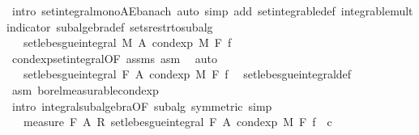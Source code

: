 \begin{isabellebody}
\ {\isacharparenleft}{\kern0pt}intro\ set{\isacharunderscore}{\kern0pt}integral{\isacharunderscore}{\kern0pt}mono{\isacharunderscore}{\kern0pt}AE{\isacharunderscore}{\kern0pt}banach{\isacharcomma}{\kern0pt}\ auto\ simp\ add{\isacharcolon}{\kern0pt}\ set{\isacharunderscore}{\kern0pt}integrable{\isacharunderscore}{\kern0pt}def\ integrable{\isacharunderscore}{\kern0pt}mult{\isacharunderscore}{\kern0pt}indicator\ subalgebra{\isacharunderscore}{\kern0pt}def\ sets{\isacharunderscore}{\kern0pt}restr{\isacharunderscore}{\kern0pt}to{\isacharunderscore}{\kern0pt}subalg{\isacharparenright}{\kern0pt}\isanewline
\ \ \ \ \isamarkupfalse%
\ \isamarkupfalse%
\ {\isachardoublequoteopen}{\isachardot}{\kern0pt}{\isachardot}{\kern0pt}{\isachardot}{\kern0pt}\ {\isacharequal}{\kern0pt}\ set{\isacharunderscore}{\kern0pt}lebesgue{\isacharunderscore}{\kern0pt}integral\ M\ A\ {\isacharparenleft}{\kern0pt}cond{\isacharunderscore}{\kern0pt}exp\ M\ F\ f{\isacharparenright}{\kern0pt}{\isachardoublequoteclose}\ \isamarkupfalse%
\ cond{\isacharunderscore}{\kern0pt}exp{\isacharunderscore}{\kern0pt}set{\isacharunderscore}{\kern0pt}integral{\isacharbrackleft}{\kern0pt}OF\ assms{\isacharparenleft}{\kern0pt}{}{\isacharparenright}{\kern0pt}{\isacharbrackright}{\kern0pt}\ asm\ \isamarkupfalse%
\ auto\isanewline
\ \ \ \ \isamarkupfalse%
\ \isamarkupfalse%
\ {\isachardoublequoteopen}{\isachardot}{\kern0pt}{\isachardot}{\kern0pt}{\isachardot}{\kern0pt}\ {\isacharequal}{\kern0pt}\ set{\isacharunderscore}{\kern0pt}lebesgue{\isacharunderscore}{\kern0pt}integral\ {\isacharquery}{\kern0pt}F\ A\ {\isacharparenleft}{\kern0pt}cond{\isacharunderscore}{\kern0pt}exp\ M\ F\ f{\isacharparenright}{\kern0pt}{\isachardoublequoteclose}\ \isamarkupfalse%
\ set{\isacharunderscore}{\kern0pt}lebesgue{\isacharunderscore}{\kern0pt}integral{\isacharunderscore}{\kern0pt}def\ \isamarkupfalse%
\ asm\ borel{\isacharunderscore}{\kern0pt}measurable{\isacharunderscore}{\kern0pt}cond{\isacharunderscore}{\kern0pt}exp\ \isamarkupfalse%
\ {\isacharparenleft}{\kern0pt}intro\ integral{\isacharunderscore}{\kern0pt}subalgebra{}{\isacharbrackleft}{\kern0pt}OF\ subalg{\isacharcomma}{\kern0pt}\ symmetric{\isacharbrackright}{\kern0pt}{\isacharcomma}{\kern0pt}\ simp{\isacharparenright}{\kern0pt}\isanewline
\ \ \ \ \isamarkupfalse%
\ \isamarkupfalse%
\ {\isachardoublequoteopen}{\isacharparenleft}{\kern0pt}{}\ {\isacharslash}{\kern0pt}\ measure\ {\isacharquery}{\kern0pt}F\ A{\isacharparenright}{\kern0pt}\ {\isacharasterisk}{\kern0pt}\isactrlsub R\ set{\isacharunderscore}{\kern0pt}lebesgue{\isacharunderscore}{\kern0pt}integral\ {\isacharquery}{\kern0pt}F\ A\ {\isacharparenleft}{\kern0pt}cond{\isacharunderscore}{\kern0pt}exp\ M\ F\ f{\isacharparenright}{\kern0pt}\ {\isasymin}\ {\isacharbraceleft}{\kern0pt}c{\isachardot}{\kern0pt}{\isachardot}{\kern0pt}{\isacharbraceright}{\kern0pt}{\isachardoublequoteclose}\ \isamarkupfalse%

\end{isabellebody}
